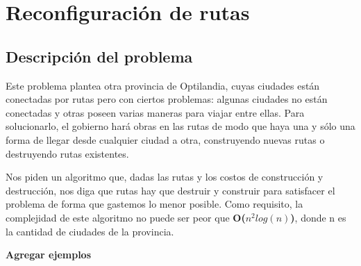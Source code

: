 \section{Reconfiguración de rutas}

\subsection{Descripción del problema}
Este problema plantea otra provincia de Optilandia, cuyas ciudades están conectadas por rutas pero con ciertos problemas: algunas ciudades no están conectadas y otras poseen varias maneras para viajar entre ellas. Para solucionarlo, el gobierno hará obras en las rutas de modo que haya una y sólo una forma de llegar desde cualquier ciudad a otra, construyendo nuevas rutas o destruyendo rutas existentes. 
\\
\par
Nos piden un algoritmo que, dadas las rutas y los costos de construcción y destrucción, nos diga que rutas hay que destruir y construir para satisfacer el problema de forma que gastemos lo menor posible. Como requisito, la complejidad de este algoritmo no puede ser peor que \textbf{O($n^2log(n)$)}, donde n es la cantidad de ciudades de la provincia.
\\
\par
\textbf{Agregar ejemplos}
\\
\par
